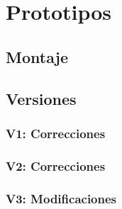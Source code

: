 \chapter{Prototipos}

\section{Montaje}
\section{Versiones}
\subsection{V1: Correcciones}
\subsection{V2: Correcciones}
\subsection{V3: Modificaciones}